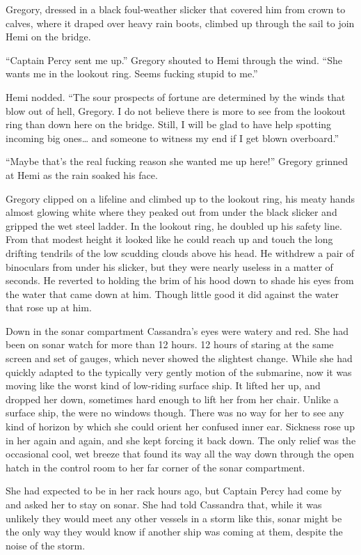 \documentclass[
]{scrbook}
\begin{document}
Gregory, dressed in a black foul-weather slicker that covered him from
crown to calves, where it draped over heavy rain boots, climbed up
through the sail to join Hemi on the bridge.

``Captain Percy sent me up.'' Gregory shouted to Hemi through the wind.
``She wants me in the lookout ring. Seems fucking stupid to me.''

Hemi nodded. ``The sour prospects of fortune are determined by the winds
that blow out of hell, Gregory. I do not believe there is more to see
from the lookout ring than down here on the bridge. Still, I will be
glad to have help spotting incoming big ones\ldots{} and someone to
witness my end if I get blown overboard.''

``Maybe that's the real fucking reason she wanted me up here!'' Gregory
grinned at Hemi as the rain soaked his face.

Gregory clipped on a lifeline and climbed up to the lookout ring, his
meaty hands almost glowing white where they peaked out from under the
black slicker and gripped the wet steel ladder. In the lookout ring, he
doubled up his safety line. From that modest height it looked like he
could reach up and touch the long drifting tendrils of the low scudding
clouds above his head. He withdrew a pair of binoculars from under his
slicker, but they were nearly useless in a matter of seconds. He
reverted to holding the brim of his hood down to shade his eyes from the
water that came down at him. Though little good it did against the water
that rose up at him.

Down in the sonar compartment Cassandra's eyes were watery and red. She
had been on sonar watch for more than 12 hours. 12 hours of staring at
the same screen and set of gauges, which never showed the slightest
change. While she had quickly adapted to the typically very gently
motion of the submarine, now it was moving like the worst kind of
low-riding surface ship. It lifted her up, and dropped her down,
sometimes hard enough to lift her from her chair. Unlike a surface ship,
the were no windows though. There was no way for her to see any kind of
horizon by which she could orient her confused inner ear. Sickness rose
up in her again and again, and she kept forcing it back down. The only
relief was the occasional cool, wet breeze that found its way all the
way down through the open hatch in the control room to her far corner of
the sonar compartment.

She had expected to be in her rack hours ago, but Captain Percy had come
by and asked her to stay on sonar. She had told Cassandra that, while it
was unlikely they would meet any other vessels in a storm like this,
sonar might be the only way they would know if another ship was coming
at them, despite the noise of the storm.
\end{document}
